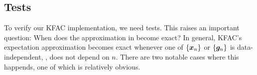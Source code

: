 \subsection{Tests}

To verify our KFAC implementation, we need tests.
This raises an important question: When does the approximation in  become exact?
In general, KFAC's expectation approximation becomes exact whenever one of $\{{\bm{x}}_n\}$ or $\{{\bm{g}}_n\}$ is data-independent, \ie, does not depend on $n$.
There are two notable cases where this happends, one of which is relatively obvious.

